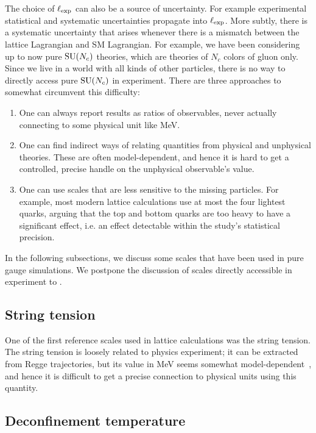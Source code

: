 The choice of $\ell_{\rm exp}$ can also be a source of uncertainty. For example
experimental statistical and systematic uncertainties propagate into 
$\ell_{\rm exp}$. More subtly, there is a systematic uncertainty that arises
whenever there is a mismatch between the lattice Lagrangian and SM Lagrangian.
For example, we have been considering up to now pure $\operatorname{SU}(N_c)$ theories, which
are theories of $N_c$ colors of gluon only. Since we live in a world with all
kinds of other particles, there is no way to directly access pure $\operatorname{SU}(N_c)$ in
experiment. There are three approaches to somewhat circumvent this difficulty:
\begin{enumerate}
\item One can always report results as ratios of observables, never actually
connecting to some physical unit like MeV.
\item One can find indirect ways of relating quantities from physical and
unphysical theories. These are often model-dependent, and hence it is hard to
get a controlled, precise handle on the unphysical observable's value.
\item One can use scales that are less sensitive to the missing particles. For
example, most modern lattice calculations use at most the four lightest quarks,
arguing that the top and bottom quarks are too heavy to have a significant
effect, i.e. an effect detectable within the study's statistical precision.
\end{enumerate}
In the following subsections, we discuss some scales that have been used in pure
gauge simulations. We postpone the discussion of scales directly accessible in
experiment to .


\subsection{String tension}


One of the first reference scales used in lattice calculations was the string
tension. The string tension is loosely related to physics experiment; it can be
extracted from Regge trajectories, but its value in MeV seems somewhat
model-dependent~\cite{smit_introduction_2002}, and hence it is difficult
to get a precise connection to physical units using this quantity.


\subsection{Deconfinement temperature}


